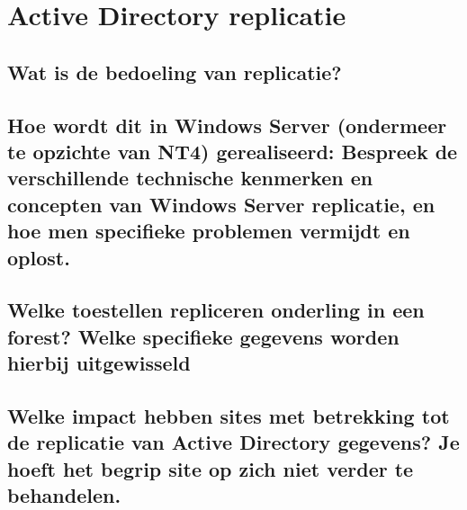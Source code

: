 \chapter{Active Directory replicatie}

\section{Wat is de bedoeling van replicatie?}

\section{Hoe wordt dit in Windows Server (ondermeer te opzichte van NT4)
gerealiseerd: Bespreek de verschillende technische kenmerken en concepten van
Windows Server replicatie, en hoe men specifieke problemen vermijdt en oplost.}

\section{Welke toestellen repliceren onderling in een forest? Welke
specifieke gegevens worden hierbij uitgewisseld}

\section{Welke impact hebben sites met betrekking tot de replicatie van Active
Directory gegevens? Je hoeft het begrip site op zich niet verder te behandelen.}
